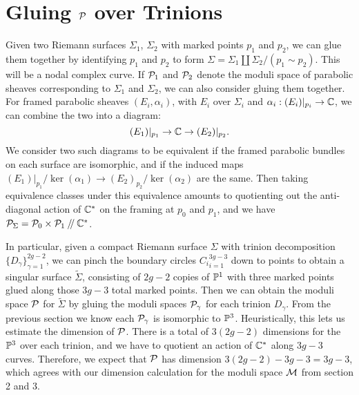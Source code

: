 	\section{Gluing $\mathcal{P}$ over Trinions }
	\label{s:p-gluing}
	Given two Riemann surfaces $\Sigma_1$, $\Sigma_2$ with marked points $p_1$ and $p_2$, we can glue them together by identifying $p_1$ and $p_2$ to form $\Sigma = \Sigma_1 \coprod \Sigma_2 / (p_1 \sim p_2)$. This will be a nodal complex curve. If $\mathcal{P}_1$ and $\mathcal{P}_2$ denote the moduli space of parabolic sheaves corresponding to $\Sigma_1$ and $\Sigma_2$, we can also consider gluing them together. For framed parabolic sheaves $(E_i,\alpha_i)$, with $E_i$ over $\Sigma_i$ and $\alpha_i:(E_i)|_{p_i}\to \mathbb{C}$, we can combine the two into a diagram:
	\begin{equation}
		(E_1)|_{p_1} \to \mathbb{C} \rightarrow (E_2)|_{p_2}.
	\end{equation}
	We consider two such diagrams to be equivalent if the framed parabolic bundles on each surface are isomorphic, and if the induced maps $(E_1)|_{p_1}/\ker(\alpha_1) \to (E_2)_{p_2}/\ker(\alpha_2)$ are the same. Then taking equivalence classes under this equivalence amounts to quotienting out the anti-diagonal action of $\mathbb{C}^\ast$ on the framing at $p_0$ and $p_1$, and we have $\mathcal{P}_{\Sigma} = \mathcal{P}_0 \times \mathcal{P}_1 \mathbin{/\mkern-4mu/} \mathbb{C}^\ast$. 
	
	In particular, given a compact Riemann surface $\Sigma$ with trinion decomposition $\{D_\gamma\}_{\gamma=1}^{2g-2}$, we can pinch the boundary circles ${C_i}_{i=1}^{3g-3}$ down to points to obtain a singular surface $\tilde{\Sigma}$, consisting of $2g-2$ copies of $\mathbb{P}^1$ with three marked points glued along those $3g-3$ total marked points. Then we can obtain the moduli space $\mathcal{P}$ for $\tilde{\Sigma}$ by gluing the moduli spaces $\mathcal{P}_\gamma$ for each trinion $D_\gamma$. From the previous section we know each $\mathcal{P}_\gamma$ is isomorphic to $\mathbb{P}^3$. Heuristically, this lets us estimate the dimension of $\mathcal{P}$. There is a total of $3(2g-2)$ dimensions for the $\mathbb{P}^3$ over each trinion, and we have to quotient an action of $\mathbb{C}^\ast$ along $3g-3$ curves. Therefore, we expect that $\mathcal{P}$ has dimension $3(2g-2)-3g-3 = 3g-3$, which agrees with our dimension calculation for the moduli space $\mathcal{M}$ from section 2 and 3. 
	

